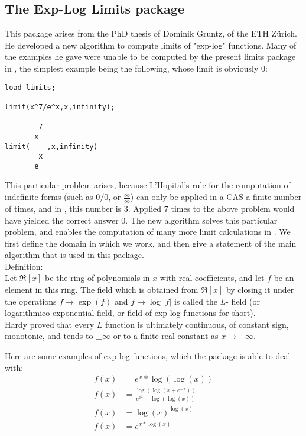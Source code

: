 

\subsection{The Exp-Log Limits package}
This package  arises from the PhD thesis of Dominik Gruntz, of the ETH  Z\"{u}rich. He developed a new algorithm to compute limits of "exp-log" functions. Many of the examples he gave were unable to be computed by the present limits package in \REDUCE, the simplest example being the following, whose limit is obviously $0$:
\begin{verbatim}
load limits;

limit(x^7/e^x,x,infinity);

        7
       x
limit(----,x,infinity)
        x
       e
\end{verbatim}

This particular problem arises, because L'Hopital's rule for the computation of indefinite forms (such as $0/0$, or $\frac{\infty}{\infty}$) can only be applied in a CAS a finite number of times, and in \REDUCE, this number is 3. Applied 7 times to the above problem would have yielded the correct answer 0.
The new algorithm solves this particular problem, and enables the computation of many more limit calculations in \REDUCE. We first define the domain in which we work, and then give a statement of the main algorithm that is used in this package. \\[\baselineskip]
Definition: \\
Let $\Re[x]$ be the ring of polynomials in $x$ with real coefficients, and let $f$ be an element in this ring. The field which is obtained from $\Re[x]$ by closing it under the operations $f\rightarrow\exp(f)$ and $f\rightarrow\log |f|$ is called the $L$- field (or logarithmico-exponential field, or field of exp-log functions for short).
\\[\baselineskip]
Hardy proved that every $L$ function is ultimately continuous, of constant sign, monotonic, and tends to $\pm \infty$ or to a finite real constant as $x\rightarrow +\infty.$

Here are some examples of exp-log functions, which the package is able to deal with:
\begin{align*}
 f(x) &=e^{x}*\log(\log(x)) \\[2mm]
 f(x) &=\frac{\log(\log(x+e^{-x}))}{e^{x^{2}}+\log(\log(x))}  \\[2mm]
 f(x) &=\log(x)^{\log(x)}  \\[2mm]
 f(x) &=e^{x*\log(x)}
\end{align*}

